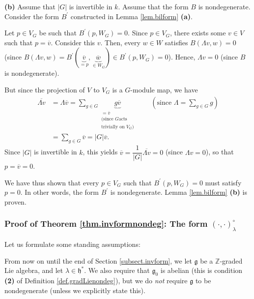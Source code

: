 \documentclass[etingof-lie.tex]{subfiles}
\begin{document}
\textbf{(b)} Assume that $\left\vert G\right\vert $ is invertible in $k$.
Assume that the form $B$ is nondegenerate. Consider the form $B^{\prime}$
constructed in Lemma \ref{lem.bilform} \textbf{(a)}.

Let $p\in V_{G}$ be such that $B^{\prime}\left(  p,W_{G}\right)  =0$. Since
$p\in V_{G}$, there exists some $v\in V$ such that $p=\overline{v}$. Consider
this $v$. Then, every $w\in W$ satisfies $B\left(  \Lambda v,w\right)  =0$
(since $B\left(  \Lambda v,w\right)  =B^{\prime}\left(  \underbrace{\overline
{v}}_{=p},\underbrace{\overline{w}}_{\in W_{G}}\right)  \in B^{\prime}\left(
p,W_{G}\right)  =0$). Hence, $\Lambda v=0$ (since $B$ is nondegenerate).

But since the projection of $V$ to $V_{G}$ is a $G$-module map, we have
\begin{align*}
\overline{\Lambda v}  &  =\Lambda\overline{v}=\sum\limits_{g\in G}%
\underbrace{g\overline{v}}_{\substack{=\overline{v}\\\text{(since }G\text{
acts}\\\text{trivially on }V_{G}\text{)}}}\ \ \ \ \ \ \ \ \ \ \left(
\text{since }\Lambda=\sum\limits_{g\in G}g\right) \\
&  =\sum\limits_{g\in G}\overline{v}=\left\vert G\right\vert \overline{v}.
\end{align*}
Since $\left\vert G\right\vert $ is invertible in $k$, this yields
$\overline{v}=\dfrac{1}{\left\vert G\right\vert }\overline{\Lambda v}=0$
(since $\Lambda v=0$), so that $p=\overline{v}=0$.

We have thus shown that every $p\in V_{G}$ such that $B^{\prime}\left(
p,W_{G}\right)  =0$ must satisfy $p=0$. In other words, the form $B^{\prime}$
is nondegenerate. Lemma \ref{lem.bilform} \textbf{(b)} is proven.

\subsubsection{Proof of Theorem \ref{thm.invformnondeg}: The form
\texorpdfstring{$\left(\cdot,\cdot\right)  _{\lambda}^{\circ}$}{induced
by lambda on the k-th symmetric power}}

Let us formulate some standing assumptions:

\begin{Convention}
From now on until the end of Section \ref{subsect.invform}, we let
$\mathfrak{g}$ be a $\mathbb{Z}$-graded Lie algebra, and let $\lambda
\in\mathfrak{h}^{\ast}$. We also require that $\mathfrak{g}_{0}$ is abelian
(this is condition \textbf{(2)} of Definition \ref{def.gradLienondeg}), but we
do \textit{not} require $\mathfrak{g}$ to be nondegenerate (unless we
explicitly state this).
\end{Convention}
\end{document}
